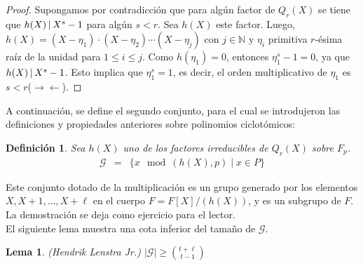 \documentclass[10pt]{article}
\newcommand{\0}{\mathbf{0}}
\newcommand{\1}{\mathbf{1}}
\newcommand{\divi}{\hspace{1.8pt}|\hspace{1.8pt}}
\newcommand{\modulohp}{\mod (h(X),p)}
\newcommand{\+}{\oplus}
\newcommand{\comentario}[1]{}
\newtheorem{lemma}[theorem]{Lema}
\newtheorem{definition}[theorem]{Definición}
\theoremstyle{remark}
\theoremstyle{remark}
\newcommand{\tq}{\mid}
\begin{document}
	\begin{proof}
		Supongamos por contradicción que para algún factor de $Q_r(X)$ se tiene que $h(X)\divi  X^s-1$ para algún $s<r$. Sea $h(X)$ este factor. Luego, $h(X)= (X-\eta_1)\cdot(X-\eta_2)\cdots(X-\eta_j)$ con $j\in\mathbb{N}$ y $\eta_i$ primitiva $r$-ésima raí­z de la unidad para $1\leq i\leq j$. Como $h(\eta_1) = 0$, entonces  $\eta_1^s-1 = 0$, ya que $h(X)\divi  X^s-1$. Esto implica que $\eta_1^s=1$, es decir, el orden multiplicativo de $\eta_1$ es $s<r$($\rightarrow\leftarrow$).
	\end{proof}
	A continuación, se define el segundo conjunto, para el cual se introdujeron las definiciones y propiedades anteriores sobre polinomios ciclotómicos:
	\begin{definition}
		Sea $h(X)$ uno de los factores irreducibles de $Q_r(X)$ sobre $F_p$.
		\begin{eqnarray}
			\mathcal{G} &=& \{x\modulohp\tq x\in P\}\nonumber 
		\end{eqnarray}
		
	\end{definition}
	Este conjunto dotado de la multiplicación es un grupo generado por los elementos $X,X+1,...,X+\ell $ en el cuerpo $F=F[X]/(h(X))$, y es un subgrupo de $F$. La demostración se deja como ejercicio para el lector.\comentario{demostracion de subgrupo propuesta para el lector}\\
	El siguiente lema muestra una cota inferior del tamaño de $\mathcal{G}$.
	\begin{lemma}
		(Hendrik Lenstra Jr.) $|\mathcal{G}|\geq {{t+\ell }\choose{t-1}}$
	\end{lemma}
	
\end{document}
